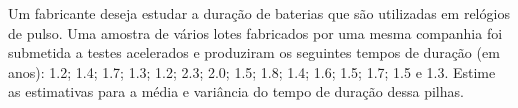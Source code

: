 %
%


\begin{exercicioBanco}[\valorquestao]
    Um fabricante deseja estudar a duração de baterias que são utilizadas em relógios de pulso. Uma amostra de vários lotes fabricados por uma mesma companhia foi submetida a testes acelerados e produziram os seguintes tempos de duração (em anos): 1.2; 1.4; 1.7; 1.3; 1.2; 2.3; 2.0; 1.5; 1.8; 1.4; 1.6; 1.5; 1.7; 1.5 e 1.3. Estime as estimativas para a média e variância do tempo de duração dessa pilhas.
\end{exercicioBanco}

